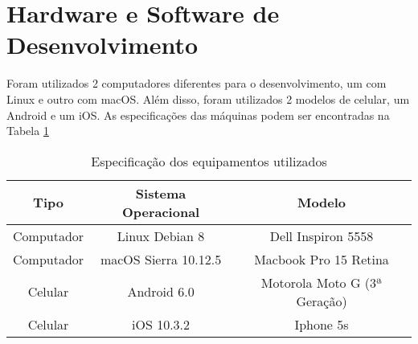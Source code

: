 \section{Hardware e Software de Desenvolvimento}

Foram utilizados 2 computadores diferentes para o desenvolvimento, um com Linux e outro com macOS. Além disso, foram utilizados 2 modelos de celular, um Android e um iOS. As especificações das máquinas podem ser encontradas na Tabela \ref{tab-hardware}

\begin{table}[h]
    \centering
    \caption{Especificação dos equipamentos utilizados}
    \label{tab-hardware}
    \begin{tabular}{ccc}
        \toprule
        \textbf{Tipo} & \textbf{Sistema Operacional} & \textbf{Modelo}              \\
        \midrule
        Computador    & Linux Debian 8               & Dell Inspiron 5558           \\
        Computador    & macOS Sierra 10.12.5         & Macbook Pro 15 Retina        \\
        Celular       & Android 6.0                  & Motorola Moto G (3ª Geração) \\
        Celular       & iOS 10.3.2                   & Iphone 5s                    \\
        \bottomrule
    \end{tabular}
\end{table}
